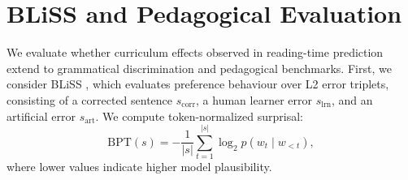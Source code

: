 \documentclass[11pt]{article}
\begin{document}



\section{BLiSS and Pedagogical Evaluation}

We evaluate whether curriculum effects observed in reading-time prediction extend to grammatical discrimination and pedagogical benchmarks. First, we consider BLiSS \citep{gao2025bliss}, which evaluates preference behaviour over L2 error triplets, consisting of a corrected sentence $s_{\mathrm{corr}}$, a human learner error $s_{\mathrm{lrn}}$, and an artificial error $s_{\mathrm{art}}$. We compute token-normalized surprisal:
\[
\mathrm{BPT}(s) = -\frac{1}{|s|}\sum_{t=1}^{|s|}\log_2 p(w_t \mid w_{<t}),
\]
where lower values indicate higher model plausibility.
\end{document}
